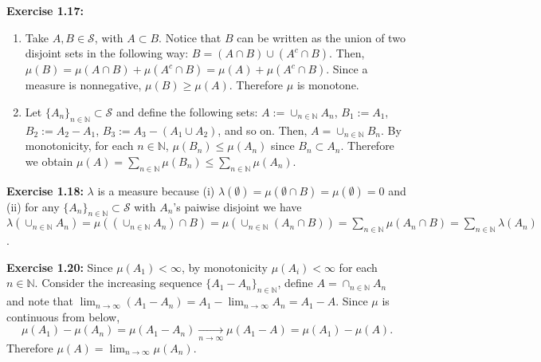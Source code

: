 \documentclass[11.5pt, letterpaper, bibtotoc,
    tablecaptionabove, figurecaptionabove]{article}
\begin{document}
\textbf{Exercise 1.17:}
\begin{enumerate}
\item
Take $A,B\in\mathcal S$, with $A\subset B$.
Notice that $B$ can be written as the union of two disjoint sets in the following way: 
$B = (A\cap B) \cup (A^c\cap B)$.
Then, $\mu(B)=\mu(A\cap B) + \mu(A^c\cap B) = \mu(A) + \mu(A^c\cap B)$.
Since a measure is nonnegative, $\mu(B)\geq\mu(A)$.
Therefore $\mu$ is monotone.

\item
Let $\{A_n\}_{n\in\mathbb N}\subset\mathcal S$ and define the following sets: $A := \cup_{n\in\mathbb N} A_n$,
$B_1 := A_1$, $B_2 := A_2-A_1$, $B_3 := A_3-(A_1\cup A_2)$, and so on.
Then, $A = \cup_{n\in\mathbb N} B_n$.
By monotonicity, for each $n\in\mathbb N$, $\mu(B_n)\leq\mu(A_n)$ since $B_n\subset A_n$.
Therefore we obtain $\mu(A)=\sum_{n\in\mathbb N}\mu(B_n)\leq \sum_{n\in\mathbb N}\mu(A_n)$.
\end{enumerate}

\textbf{Exercise 1.18:}
$\lambda$ is a measure because (i) $\lambda(\emptyset) = \mu(\emptyset\cap B) = \mu(\emptyset) = 0$
and (ii) for any $\{A_n\}_{n\in\mathbb N}\subset\mathcal S$ with $A_n$'s paiwise disjoint we have
$\lambda(\cup_{n\in\mathbb N} A_n) = \mu\left((\cup_{n\in\mathbb N} A_n) \cap B\right) =
\mu\left(\cup_{n\in\mathbb N} (A_n \cap B)\right) = \sum_{n\in\mathbb N}\mu(A_n\cap B) = \sum_{n\in\mathbb N}\lambda(A_n)$.

\textbf{Exercise 1.20:}
Since $\mu(A_1)<\infty$, by monotonicity $\mu(A_i)<\infty$ for each $n\in\mathbb N$.
Consider the increasing sequence $\{A_1-A_n\}_{n\in\mathbb N}$,
define $A=\cap_{n\in\mathbb N} A_n$
and note that $\lim_{n\to\infty}(A_1-A_n) = A_1-\lim_{n\to\infty}A_n = A_1-A$.
Since $\mu$ is continuous from below,
\begin{equation*}
\mu(A_1)-\mu(A_n) = \mu(A_1-A_n) \underset{n\to\infty}{\longrightarrow}
\mu(A_1-A) = \mu(A_1)-\mu(A).
\end{equation*}
Therefore $\mu(A)=\lim_{n\to\infty}\mu(A_n)$.
\end{document}
